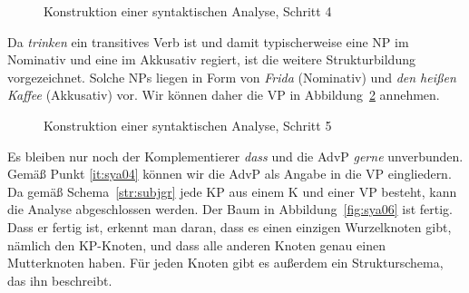 \begin{figure}
  \caption{Konstruktion einer syntaktischen Analyse, Schritt 4}
  \label{fig:sya04}
\end{figure}

Da \textit{trinken} ein transitives Verb ist und damit typischerweise eine NP im Nominativ und eine im Akkusativ regiert, ist die weitere Strukturbildung vorgezeichnet.
Solche NPs liegen in Form von \textit{Frida} (Nominativ) und \textit{den heißen Kaffee} (Akkusativ) vor.
Wir können daher die VP in Abbildung~\ref{fig:sya05} annehmen.

\begin{figure}
  \caption{Konstruktion einer syntaktischen Analyse, Schritt 5}
  \label{fig:sya05}
\end{figure}

Es bleiben nur noch der Komplementierer \textit{dass} und die AdvP \textit{gerne} unverbunden.
Gemäß Punkt \ref{it:sya04} können wir die AdvP als Angabe in die VP eingliedern.
Da gemäß Schema~\ref{str:subjgr} jede KP aus einem K und einer VP besteht, kann die Analyse abgeschlossen werden.
Der Baum in Abbildung~\ref{fig:sya06} ist fertig.
Dass er fertig ist, erkennt man daran, dass es einen einzigen Wurzelknoten gibt, nämlich den KP-Knoten, und dass alle anderen Knoten genau einen Mutterknoten haben.
Für jeden Knoten gibt es außerdem ein Strukturschema, das ihn beschreibt.

